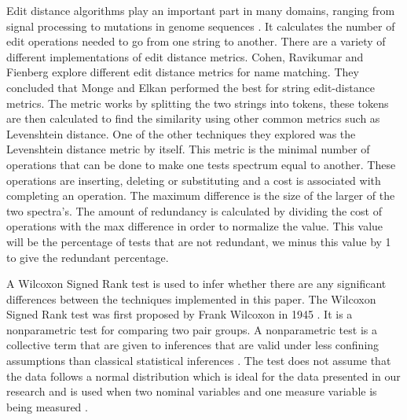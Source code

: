 Edit distance algorithms play an important part in many domains, ranging from signal processing to mutations in genome sequences \cite{navarro2001guided}. It calculates the number of edit operations needed to go from one string to another. There are a variety of different implementations of edit distance metrics. Cohen, Ravikumar and Fienberg \cite{cohen2003comparison} explore different edit distance metrics for name matching. They concluded that Monge and Elkan \cite{monge1997efficient} performed the best for string edit-distance metrics. The metric works by splitting the two strings into tokens, these tokens are then calculated to find the similarity using other common metrics such as Levenshtein distance. One of the other techniques they explored was the Levenshtein distance \cite{levenshtein1966binary} metric by itself. This metric is the minimal number of operations that can be done to make one tests spectrum equal to another. These operations are inserting, deleting or substituting and a cost is associated with completing an operation. The maximum difference is the size of the larger of the two spectra's. The amount of redundancy is calculated by dividing the cost of operations with the max difference in order to normalize the value. This value will be the percentage of tests that are not redundant, we minus this value by 1 to give the redundant percentage.

A Wilcoxon Signed Rank test is used to infer whether there are any significant differences between the techniques implemented in this paper. The Wilcoxon Signed Rank test was first proposed by Frank Wilcoxon in 1945 \cite{wilcoxon1945individual}. It is a nonparametric test for comparing two pair groups. A nonparametric test is a collective term that are given to inferences that are valid under less confining assumptions than classical statistical inferences \cite{nonparametric}. The test does not assume that the data follows a normal distribution which is ideal for the data presented in our research and is used when two nominal variables and one measure variable is being measured \cite{mcdonald2009handbook}.
